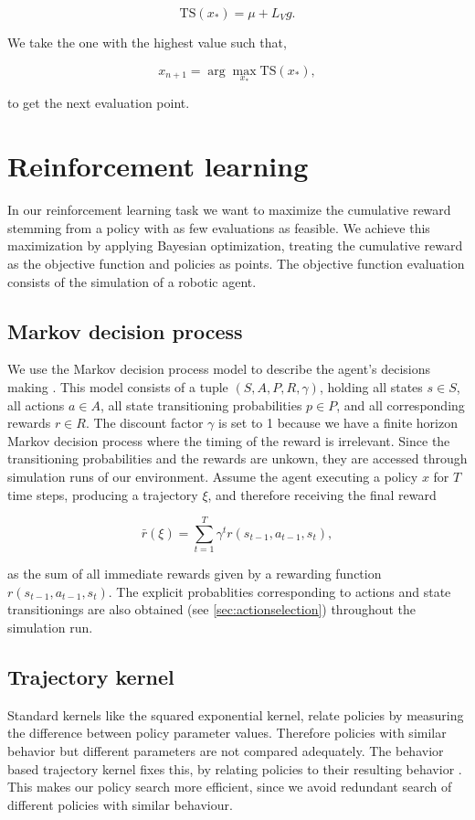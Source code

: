 $$\mathrm{TS}(x_*) = \mu + L_V g.$$

We take the one with the highest value such that,

$$x_{n+1} = \arg \max_{x_*} \mathrm{TS}(x_*),$$

to get the next evaluation point.

\section{Reinforcement learning}

In our reinforcement learning task we want to maximize the cumulative reward stemming from a policy with as few evaluations as feasible. We achieve this maximization by applying Bayesian optimization, treating the cumulative reward as the objective function and policies as points. The objective function evaluation consists of the simulation of a robotic agent.

\subsection{Markov decision process}
We use the Markov decision process model to describe the agent's decisions making \cite{sutton1998reinforcement}. This model consists of a tuple $(S,A,P,R,\gamma)$, holding all states $s \in S$, all actions $a \in A$, all state transitioning probabilities $p \in P$, and all corresponding rewards $r \in R$. The discount factor $\gamma$ is set to 1 because we have a finite horizon Markov decision process where the timing of the reward is irrelevant. Since the transitioning probabilities and the rewards are unkown, they are accessed through simulation runs of our environment. Assume the agent executing a policy $x$ for $T$ time steps, producing a trajectory $\xi$, and therefore receiving the final reward

$$\bar{r}(\xi)=\sum_{t=1}^T \gamma^t r(s_{t-1}, a_{t-1}, s_{t}),$$

as the sum of all immediate rewards given by a rewarding function $r(s_{t-1}, a_{t-1}, s_{t})$. The explicit probablities corresponding to actions and state transitionings are also obtained (see \ref{sec:actionselection}) throughout the simulation run.

\subsection{Trajectory kernel}\label{sec:trajKernel}
Standard kernels like the squared exponential kernel, relate policies by measuring the difference between policy parameter values. Therefore policies with similar behavior but different parameters are not compared adequately. The behavior based trajectory kernel fixes this, by relating policies to their resulting behavior \cite{wilson2014using}. This makes our policy search more efficient, since we avoid redundant search of different policies with similar behaviour.

